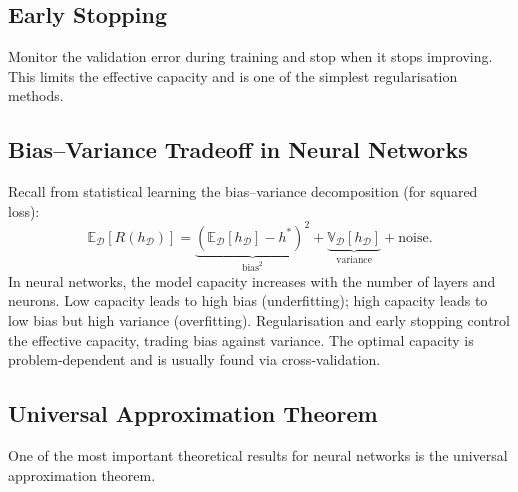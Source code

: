 \documentclass{tufte-handout}
\let\subsubsection\subsection
\begin{document}
\subsubsection{Early Stopping}
Monitor the validation error during training and stop when it stops improving. This limits the effective capacity and is one of the simplest regularisation methods.

\subsection{Bias–Variance Tradeoff in Neural Networks}

Recall from statistical learning the bias–variance decomposition (for squared loss):
\[
\mathbb{E}_{\mathcal{D}}[R(h_{\mathcal{D}})] = \underbrace{(\mathbb{E}_{\mathcal{D}}[h_{\mathcal{D}}] - h^*)^2}_{\text{bias}^2} + \underbrace{\mathbb{V}_{\mathcal{D}}[h_{\mathcal{D}}]}_{\text{variance}} + \text{noise}.
\]
In neural networks, the model capacity increases with the number of layers and neurons. Low capacity leads to high bias (underfitting); high capacity leads to low bias but high variance (overfitting). Regularisation and early stopping control the effective capacity, trading bias against variance. The optimal capacity is problem‑dependent and is usually found via cross‑validation.

\begin{marginfigure}
\centering
{}
\caption{Typical bias–variance tradeoff: total generalisation error has a minimum at the optimal capacity.}
\end{marginfigure}

\subsection{Universal Approximation Theorem}

One of the most important theoretical results for neural networks is the universal approximation theorem.
\end{document}

